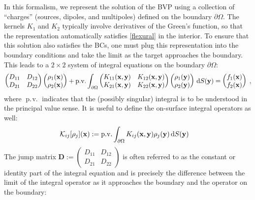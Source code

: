 \documentclass[preprint,12pt,3p]{elsarticle}
\newcommand{\dd}{ {\rm d} }
\newcommand{\pv}{\operatorname{p.\!v.}}
\begin{document}
In this formalism, we represent the solution of the BVP using a collection of ``charges'' (sources, dipoles, and multipoles) defined on the boundary $\partial\Omega$. The kernels $K_1$ and $K_2$ typically involve derivatives of the Green's function, so that the representation automatically satisfies \eqref{flexural} in the interior. To ensure that this solution also satisfies the BCs, one must plug this representation into the boundary conditions and take the limit as the target approaches the boundary. This leads to a $2\times 2$ system of integral  equations on the boundary $\partial \Omega$:
\begin{equation}
\label{eq:biesystem}
    \begin{pmatrix}
    D_{11} & D_{12} \\
    D_{21} & D_{22}
    \end{pmatrix}
    \begin{pmatrix}
        \rho_1(\mathbf{x}) \\
        \rho_2(\mathbf{x}) 
    \end{pmatrix} + \pv \int_{\partial \Omega} \begin{pmatrix}
    K_{11}(\mathbf{x},\mathbf{y}) & K_{12}(\mathbf{x},\mathbf{y}) \\
    K_{21}(\mathbf{x},\mathbf{y}) & K_{22}(\mathbf{x},\mathbf{y})
    \end{pmatrix}
    \begin{pmatrix}
        \rho_1(\mathbf{y}) \\
        \rho_2(\mathbf{y})
    \end{pmatrix} \, \dd S(\mathbf{y})
    = \begin{pmatrix}
        f_1(\mathbf{x}) \\ f_2(\mathbf{x})
    \end{pmatrix} \; ,
\end{equation}
where $\pv$ indicates that the (possibly singular) integral is to be understood in the principal
value sense. It is useful to define the on-surface integral operators as well:
\begin{align}
    \mathcal{K}_{ij}[\rho_j](\mathbf{x}) &:= \pv \int_{\partial \Omega} K_{ij}(\mathbf{x},\mathbf{y}) \rho_j(\mathbf{y})  \, \dd S(\mathbf{y}) 
\end{align}
The jump matrix $ \mathbf{D} := \begin{pmatrix}
    D_{11} & D_{12} \\
    D_{21} & D_{22}
    \end{pmatrix} $ is often referred to as the constant or identity part of the integral equation and is precisely the difference between the limit of the integral operator as it approaches the boundary and the operator on the boundary:
\end{document}
